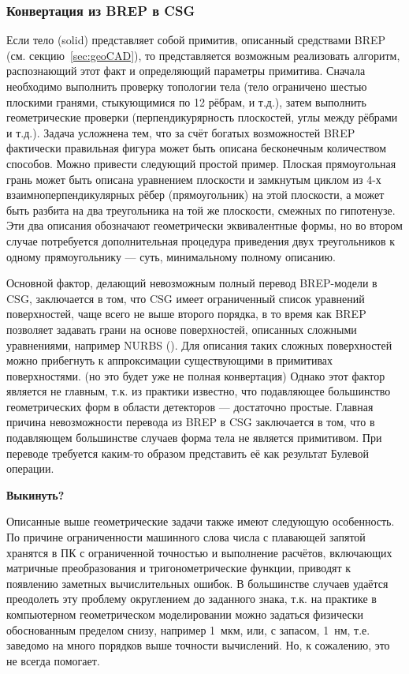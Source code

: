\subsubsection{Конвертация из BREP в CSG}\label{sec:secBREPtoCSG}

Если тело (solid) представляет собой примитив, описанный средствами BREP (см. секцию~\ref{sec:geoCAD}), то представляется возможным реализовать алгоритм, распознающий этот факт и определяющий параметры примитива. Сначала необходимо выполнить проверку топологии тела (тело ограничено шестью плоскими гранями, стыкующимися по 12 рёбрам, и т.д.), затем выполнить геометрические проверки (перпендикурярность плоскостей, углы между рёбрами и т.д.). Задача усложнена тем, что за счёт богатых возможностей BREP фактически правильная фигура может быть описана бесконечным количеством способов. Можно привести следующий простой пример. Плоская прямоугольная грань может быть описана уравнением плоскости и замкнутым циклом из 4-х взаимноперпендикулярных рёбер (прямоугольник) на этой плоскости, а может быть разбита на два треугольника на той же плоскости, смежных по гипотенузе. Эти два описания обозначают геометрически эквивалентные формы, но во втором случае потребуется дополнительная процедура приведения двух треугольников к одному прямоугольнику --- суть, минимальному полному описанию.

Основной фактор, делающий невозможным полный перевод BREP-модели в CSG, заключается в том, что CSG имеет ограниченный список уравнений поверхностей, чаще всего не выше второго порядка, в то время как BREP позволяет задавать грани на основе поверхностей, описанных сложными уравнениями, например NURBS (\cite{}). Для описания таких сложных поверхностей можно прибегнуть к аппроксимации существующими в примитивах поверхностями. (\todo но это будет уже не полная конвертация)
Однако этот фактор является не главным, т.к. из практики известно, что подавляющее большинство геометрических форм в области детекторов --- достаточно простые.
Главная причина невозможности перевода из BREP в CSG заключается в том, что в подавляющем большинстве случаев форма тела не является примитивом. При переводе требуется каким-то образом представить её как результат Булевой операции.

\todo \textbf{Выкинуть?}

Описанные выше геометрические задачи также имеют следующую особенность. По причине ограниченности машинного слова числа с плавающей запятой хранятся в ПК с ограниченной точностью и выполнение расчётов, включающих матричные преобразования и тригонометрические функции, приводят к появлению заметных вычислительных ошибок. В большинстве случаев удаётся преодолеть эту проблему округлением до заданного знака, т.к. на практике в компьютерном геометрическом моделировании можно задаться физически обоснованным пределом снизу, например 1~мкм, или, с запасом, 1~нм, т.е. заведомо на много порядков выше точности вычислений. Но, к сожалению, это не всегда помогает.

